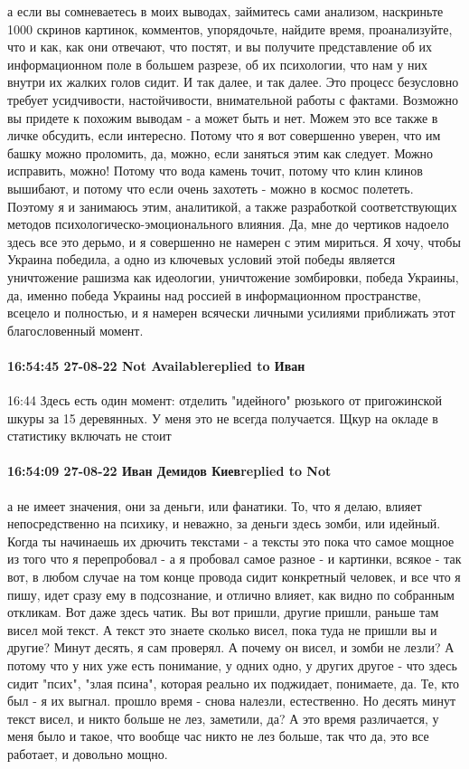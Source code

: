 а если вы сомневаетесь в моих выводах, займитесь сами анализом, наскриньте 1000
скринов картинок, комментов, упорядочьте, найдите время, проанализуйте, что и
как, как они отвечают, что постят, и вы получите представление об их
информационном поле в большем разрезе, об их психологии, что нам у них внутри
их жалких голов сидит. И так далее, и так далее. Это процесс безусловно требует
усидчивости, настойчивости, внимательной работы с фактами. Возможно вы придете
к похожим выводам - а может быть и нет. Можем это все также в личке обсудить,
если интересно. Потому что я вот совершенно уверен, что им башку можно
проломить, да, можно, если заняться этим как следует. Можно исправить, можно!
Потому что вода камень точит, потому что клин клинов вышибают, и потому что
если очень захотеть - можно в космос полететь. Поэтому я и занимаюсь этим,
аналитикой, а также разработкой соответствующих методов
психологическо-эмоционального влияния. Да, мне до чертиков надоело здесь все
это дерьмо, и я совершенно не намерен с этим мириться. Я хочу, чтобы Украина
победила, а одно из ключевых условий этой победы является уничтожение рашизма
как идеологии, уничтожение зомбировки, победа Украины, да, именно победа
Украины над россией в информационном пространстве, всецело и полностью, и я
намерен всячески личными усилиями приближать этот благословенный момент.

\paragraph{16:54:45 27-08-22 Not Availablereplied to Иван}
16:44
Здесь есть один момент: отделить "идейного" рюзького от пригожинской шкуры за 15 деревянных. У меня это не всегда получается. Щкур на окладе в статистику включать не стоит


\paragraph{16:54:09 27-08-22 Иван Демидов Киевreplied to Not}

а не имеет значения, они за деньги, или фанатики. То, что я делаю, влияет
непосредственно на психику, и неважно, за деньги здесь зомби, или идейный.
Когда ты начинаешь их дрючить текстами - а тексты это пока что самое мощное из
того что я перепробовал - а я пробовал самое разное - и картинки, всякое - так
вот, в любом случае на том конце провода сидит конкретный человек, и все что я
пишу, идет сразу ему в подсознание, и отлично влияет, как видно по собранным
откликам. Вот даже здесь чатик. Вы вот пришли, другие пришли, раньше там висел
мой текст. А текст это знаете сколько висел, пока туда не пришли вы и другие?
Минут десять, я сам проверял. А почему он висел, и зомби не лезли? А потому что
у них уже есть понимание, у одних одно, у других другое - что здесь сидит
"псих", "злая псина", которая реально их поджидает, понимаете, да. Те, кто был
- я их выгнал. прошло время - снова налезли, естественно. Но десять минут текст
висел, и никто больше не лез, заметили, да? А это время различается, у меня
было и такое, что вообще час никто не лез больше, так что да, это все работает,
и довольно мощно.


